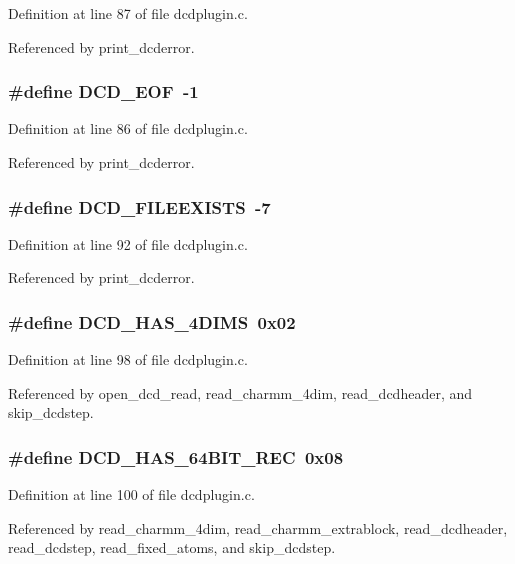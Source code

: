 Definition at line 87 of file dcdplugin.c.

Referenced by print\_\-dcderror.
\subsubsection{\setlength{\rightskip}{0pt plus 5cm}\#define DCD\_\-EOF\ -1}\label{dcdplugin_8c_a5}




Definition at line 86 of file dcdplugin.c.

Referenced by print\_\-dcderror.
\subsubsection{\setlength{\rightskip}{0pt plus 5cm}\#define DCD\_\-FILEEXISTS\ -7}\label{dcdplugin_8c_a11}




Definition at line 92 of file dcdplugin.c.

Referenced by print\_\-dcderror.
\subsubsection{\setlength{\rightskip}{0pt plus 5cm}\#define DCD\_\-HAS\_\-4DIMS\ 0x02}\label{dcdplugin_8c_a15}




Definition at line 98 of file dcdplugin.c.

Referenced by open\_\-dcd\_\-read, read\_\-charmm\_\-4dim, read\_\-dcdheader, and skip\_\-dcdstep.
\subsubsection{\setlength{\rightskip}{0pt plus 5cm}\#define DCD\_\-HAS\_\-64BIT\_\-REC\ 0x08}\label{dcdplugin_8c_a17}




Definition at line 100 of file dcdplugin.c.

Referenced by read\_\-charmm\_\-4dim, read\_\-charmm\_\-extrablock, read\_\-dcdheader, read\_\-dcdstep, read\_\-fixed\_\-atoms, and skip\_\-dcdstep.
